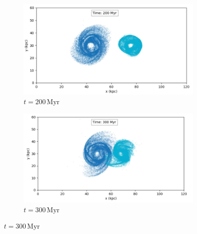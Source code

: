 \begin{figure}[H]
    \centering
    \begin{subfigure}[b]{0.8\textwidth}
        \centering
        \includegraphics[width=\textwidth]{chapters/results/img/pm-collision/200myr.png}
        \caption{$t=200\,\text{Myr}$}
        \label{fig:collision-pm-sub1}
    \end{subfigure}

    \vspace{0.2cm}

    \begin{subfigure}[b]{0.8\textwidth}
        \centering
        \includegraphics[width=\textwidth]{chapters/results/img/pm-collision/300myr.png}
        \caption{$t=300\,\text{Myr}$}
        \label{fig:collision-pm-sub2}
    \end{subfigure}

    \vspace{0.2cm}


\end{figure}
